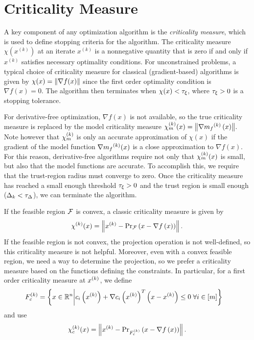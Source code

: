 \section{Criticality Measure}
\label{criticallity_measure_section}
A key component of any optimization algorithm is the {\em criticality measure}, which is used to define stopping criteria for the algorithm.
The criticality measure $\chi(x^{(k)})$ at an iterate $x^{(k)}$ is a nonnegative quantity that is zero if and only if $x^{(k)}$ satisfies necessary optimality conditions. 
For unconstrained problems,  a typical choice of criticality measure for classical (gradient-based) algorithms is given by $\chi(x) = {\left\|\nabla f(x)\right\|}$ 
since the first order optimality condition is $\nabla f(x)=0$.
The algorithm then terminates when $\chi(x) < \tau_{\xi}$, where $\tau_{\xi} >0$ is a stopping tolerance.

For derivative-free optimization,  $\nabla f(x)$ is not available,  so the true criticality measure is replaced by the model criticality measure 
${\chi_m^{(k)}}(x) = {\left\|\nabla {{m}_f}^{(k)}\left(x\right)\right\|}.$
Note however that ${\chi_m^{(k)}}$ is only an accurate approximation of $\chi(x)$ if the gradient of the model function $\nabla {{m}_f}^{(k)}(x)$ is a close approximation to $\nabla f(x)$.
For this reason, derivative-free algorithms require not only that ${\chi_m^{(k)}}(x)$ is small, but also that the model functions are accurate.
To accomplish this, we require that the trust-region radius must converge to zero.
Once the criticality measure has reached a small enough threshold $\tau_{\xi} > 0$ and the trust region is small enough ($\Delta_k < \tau_{\Delta}$), we can terminate the algorithm.



If the feasible region ${\mathcal F}$ is convex,  a classic \cite{Conejo:2013:GCT:2620806.2621814} \cite{ConnGoulToin00} criticality measure is given by
\begin{align*}
\chi^{(k)}(x) = \left\|x^{(k)} - {\textrm{Pr}}_{{\mathcal F}}\left(x- \nabla f\left(x\right)\right)\right\|.
\end{align*}
If the feasible region is not convex, the projection operation is not well-defined, so this criticality measure is not helpful.   Moreover,  even with a convex feasible region, we need a way to determine the projection, so we prefer a criticality measure based on the  functions defining the constraints.   In particular, for 
a first order criticality measure at $x^{(k)}$, we define
\begin{align}
{F_c^{(k)}} &= \left\{ x \in \mathbb R^n \bigg| c_i\left(x^{(k)}\right) + \nabla c_i\left(x^{(k)}\right)^T \left(x - x^{(k)}\right) \le 0 \; \forall i \in [m] \right\} \label{define_truefeasiblek}
\end{align}
and use
\begin{align}
\chi_c^{(k)}(x) = \left\|x^{(k)} - {\textrm{Pr}}_{{F_c^{(k)}}}\left(x- \nabla f\left(x\right)\right)\right\|. \label{define_true_criticality}
\end{align}

